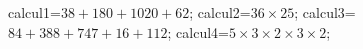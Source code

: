 \documentclass[exercice]{thedocument}%
\begin{document}
%
    \>calcul1=$38+180+1020+62$;%
    \>calcul2=$36\times25$;%
    \>calcul3=$84+388+747+16+112$;%
    \>calcul4=$5\times3\times2\times3\times2$;%
\end{document}
